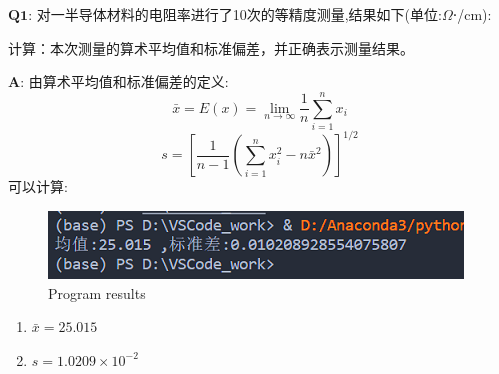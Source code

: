 \documentclass[homework]{IEEEtran}
\begin{document}
\begin{CJK}{UTF8}{gkai}
$\mathbf{Q1}$: 对一半导体材料的电阻率进行了10次的等精度测量,结果如下(单位:$\Omega$⋅/cm): \par
    [25.003,25.013,25.024,25.000,25.010,        \par
    25.030,25.020,25.007,25.027,25.016]         \par
计算：本次测量的算术平均值和标准偏差，并正确表示测量结果。 \par
$\mathbf{A}$: 由算术平均值和标准偏差的定义:
$$
\bar{x}=E(x)=\lim _{n \rightarrow \infty} \frac{1}{n} \sum_{i=1}^{n} x_{i}
$$
$$
s=\left[\frac{1}{n-1}\left(\sum_{i=1}^{n} x_{i}^{2}-n \bar{x}^{2}\right)\right]^{1 / 2}
$$
可以计算:
\begin{figure}[htb]
\centerline{\includegraphics{Images/fig1.png}}
\caption{Program results}
\label{fig1}
\end{figure}
\begin{enumerate}
\item $\bar{x}=25.015$
\item $s=1.0209 \times 10^{-2}$
\end{enumerate}


\end{CJK}
\end{document}
